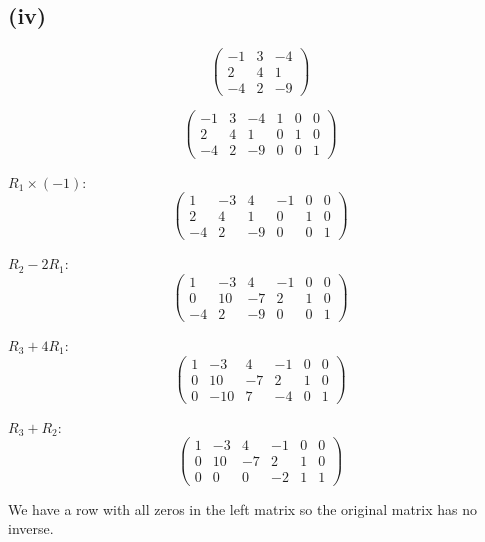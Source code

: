 \subsection*{(iv)}
\[
	\begin{pmatrix}
		-1 & 3 & -4 \\
		2  & 4 & 1  \\
		-4 & 2 & -9
	\end{pmatrix}
\]

\[
	\left(\begin{array}{ccc|ccc}
			-1 & 3 & -4 & 1 & 0 & 0 \\
			2  & 4 & 1  & 0 & 1 & 0 \\
			-4 & 2 & -9 & 0 & 0 & 1
		\end{array}\right)
\]

$R_1 \times (-1)$:
\[
	\left(\begin{array}{ccc|ccc}
			1 & -3 & 4  & -1 & 0 & 0 \\
			2 & 4  & 1  & 0  & 1 & 0 \\
			-4 & 2  & -9 & 0  & 0 & 1
		\end{array}\right)
\]

$R_2 - 2R_1$:
\[
	\left(\begin{array}{ccc|ccc}
			1 & -3 & 4  & -1 & 0 & 0 \\
			0 & 10 & -7 & 2  & 1 & 0 \\
			-4 & 2  & -9 & 0  & 0 & 1
		\end{array}\right)
\]

$R_3 + 4R_1$:
\[
	\left(\begin{array}{ccc|ccc}
			1 & -3  & 4   & -1 & 0 & 0 \\
			0 & 10  & -7  & 2  & 1 & 0 \\
			0 & -10 & 7   & -4 & 0 & 1
		\end{array}\right)
\]

$R_3 + R_2$:
\[
	\left(\begin{array}{ccc|ccc}
			1 & -3 & 4  & -1 & 0 & 0 \\
			0 & 10 & -7 & 2  & 1 & 0 \\
			0 & 0  & 0  & -2 & 1 & 1
		\end{array}\right)
\]

We have a row with all zeros in the left matrix so the original matrix has no inverse.